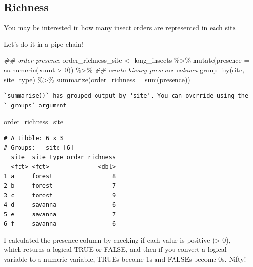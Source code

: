 \documentclass[
  letterpaper,
  DIV=11,
  numbers=noendperiod]{scrreprt}
\newenvironment{Shaded}{\begin{snugshade}}{\end{snugshade}}
\newcommand{\AttributeTok}[1]{\textcolor[rgb]{0.40,0.45,0.13}{#1}}
\newcommand{\DecValTok}[1]{\textcolor[rgb]{0.68,0.00,0.00}{#1}}
\newcommand{\DocumentationTok}[1]{\textcolor[rgb]{0.37,0.37,0.37}{\textit{#1}}}
\newcommand{\FunctionTok}[1]{\textcolor[rgb]{0.28,0.35,0.67}{#1}}
\newcommand{\NormalTok}[1]{\textcolor[rgb]{0.00,0.23,0.31}{#1}}
\newcommand{\OtherTok}[1]{\textcolor[rgb]{0.00,0.23,0.31}{#1}}
\newcommand{\SpecialCharTok}[1]{\textcolor[rgb]{0.37,0.37,0.37}{#1}}
\begin{document}
\subsection{Richness}\label{richness}

You may be interested in how many insect orders are represented in each
site.

Let's do it in a pipe chain!

\begin{Shaded}
\begin{Highlighting}[]
\DocumentationTok{\#\# order presence}
\NormalTok{order\_richness\_site }\OtherTok{\textless{}{-}}\NormalTok{ long\_insects }\SpecialCharTok{\%\textgreater{}\%} 
  \FunctionTok{mutate}\NormalTok{(}\AttributeTok{presence =} \FunctionTok{as.numeric}\NormalTok{(count }\SpecialCharTok{\textgreater{}} \DecValTok{0}\NormalTok{)) }\SpecialCharTok{\%\textgreater{}\%} \DocumentationTok{\#\# create binary presence column}
  \FunctionTok{group\_by}\NormalTok{(site, site\_type) }\SpecialCharTok{\%\textgreater{}\%}
  \FunctionTok{summarize}\NormalTok{(}\AttributeTok{order\_richness =} \FunctionTok{sum}\NormalTok{(presence))}
\end{Highlighting}
\end{Shaded}

\begin{verbatim}
`summarise()` has grouped output by 'site'. You can override using the
`.groups` argument.
\end{verbatim}

\begin{Shaded}
\begin{Highlighting}[]
\NormalTok{order\_richness\_site}
\end{Highlighting}
\end{Shaded}

\begin{verbatim}
# A tibble: 6 x 3
# Groups:   site [6]
  site  site_type order_richness
  <fct> <fct>              <dbl>
1 a     forest                 8
2 b     forest                 7
3 c     forest                 9
4 d     savanna                6
5 e     savanna                7
6 f     savanna                6
\end{verbatim}

I calculated the presence column by checking if each value is positive
(\textgreater{} 0), which returns a logical TRUE or FALSE, and then if
you convert a logical variable to a numeric variable, TRUEs become 1s
and FALSEs become 0s. Nifty!
\end{document}
